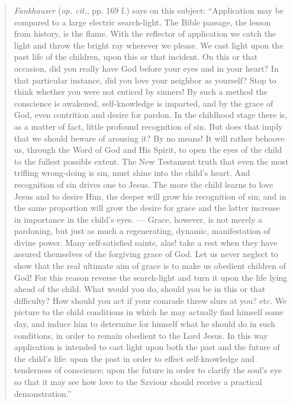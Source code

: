 \begin{quote}
\emph{Fankhauser} (\emph{op. cit.}, pp. 169 f.) says on this subject: “Application may be compared to a large electric search-light. The Bible passage, the lesson from history, is the flame. With the reflector of application we catch the light and throw the bright ray wherever we please. We cast light upon the past life of the children, upon
this or that incident. On this or that occasion, did you really have God before your eyes and in your heart? In that particular instance, did you love your neighbor as yourself? Stop to think whether you were not enticed by sinners! By such a method the conscience is awakened, self-knowledge is imparted, and by the grace of God, even contrition and desire for pardon. In the childhood stage there is, as a matter of fact, little profound recognition of sin. But does that imply that we should beware of arousing it? By no means! It will rather behoove us, through the Word of God and His Spirit, to open the eyes of the child to the fullest possible extent. The New Testament truth that even the most trifling wrong-doing is sin, must shine into the child’s heart. And recognition of sin drives one to Jesus. The more the child learns to love Jesus and to desire Him, the deeper will grow his recognition of sin; and in the same proportion will grow the desire for grace and the latter increase in importance in the child’s eyes. — Grace, however, is not merely a pardoning, but just as much a regenerating, dynamic, manifestation of divine power. Many self-satisfied saints, alas! take a rest when they have assured themselves of the forgiving grace of God. Let us never neglect to show that the real ultimate aim of grace is to make us obedient children of God! For this reason reverse the search-light and turn it upon the life lying ahead of the child. What would you do, should you be in this or that difficulty? How should you act if your comrade threw slurs at you? etc. We picture to the child conditions in which he may actually find himself some day, and induce him to determine for himself what he should do in such conditions, in order to remain obedient to the Lord Jesus. In this way application is intended to cast light upon both the past and the future of the child’s life: upon the past in order to effect self-knowledge and tenderness of conscience; upon the future in order to clarify the soul’s eye so that it may see how love to the Saviour should receive a practical demonstration.”
\end{quote}


